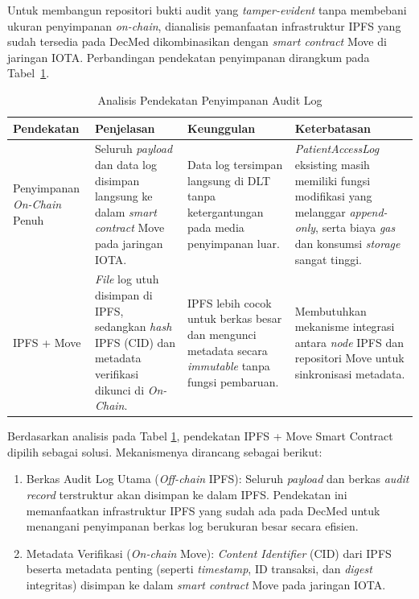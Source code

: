 Untuk membangun repositori bukti audit yang \textit{tamper-evident} tanpa membebani ukuran penyimpanan \textit{on-chain}, dianalisis pemanfaatan infrastruktur IPFS yang sudah tersedia pada DecMed dikombinasikan dengan \textit{smart contract} Move di jaringan IOTA. Perbandingan pendekatan penyimpanan dirangkum pada Tabel~\ref{tab:analisis-penyimpanan}.

\begin{table}[htbp]
\centering
\caption{Analisis Pendekatan Penyimpanan Audit Log}
\label{tab:analisis-penyimpanan}
\renewcommand{\arraystretch}{1.3}
\begin{tabular}{|p{2.5cm}|p{3.5cm}|p{3.2cm}|p{3.2cm}|}
\hline
\textbf{Pendekatan} & \textbf{Penjelasan} & \textbf{Keunggulan} & \textbf{Keterbatasan} \\ \hline
Penyimpanan \textit{On-Chain} Penuh & Seluruh \textit{payload} dan data log disimpan langsung ke dalam \textit{smart contract} Move pada jaringan IOTA. & Data log tersimpan langsung di DLT tanpa ketergantungan pada media penyimpanan luar. & \textit{PatientAccessLog} eksisting masih memiliki fungsi modifikasi yang melanggar \textit{append-only}, serta biaya \textit{gas} dan konsumsi \textit{storage} sangat tinggi. \\ \hline
IPFS + Move & \textit{File} log utuh disimpan di IPFS, sedangkan \textit{hash} IPFS (CID) dan metadata verifikasi dikunci di \textit{On-Chain}. & IPFS lebih cocok untuk berkas besar dan mengunci metadata secara \textit{immutable} tanpa fungsi pembaruan. & Membutuhkan mekanisme integrasi antara \textit{node} IPFS dan repositori Move untuk sinkronisasi metadata. \\ \hline
\end{tabular}
\end{table}

Berdasarkan analisis pada Tabel \ref{tab:analisis-penyimpanan}, pendekatan IPFS + Move Smart Contract dipilih sebagai solusi. Mekanismenya dirancang sebagai berikut:

\begin{enumerate}
    \item Berkas Audit Log Utama (\textit{Off-chain} IPFS): Seluruh \textit{payload} dan berkas \textit{audit record} terstruktur akan disimpan ke dalam IPFS. Pendekatan ini memanfaatkan infrastruktur IPFS yang sudah ada pada DecMed untuk menangani penyimpanan berkas log berukuran besar secara efisien.
    \item Metadata Verifikasi (\textit{On-chain} Move): \textit{Content Identifier} (CID) dari IPFS beserta metadata penting (seperti \textit{timestamp}, ID transaksi, dan \textit{digest} integritas) disimpan ke dalam \textit{smart contract} Move pada jaringan IOTA.
\end{enumerate}

